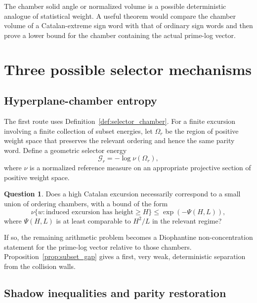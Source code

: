 \documentclass[11pt]{amsart}
\numberwithin{equation}{section}
\theoremstyle{plain}
\theoremstyle{definition}
\newtheorem{question}[theorem]{Question}
\theoremstyle{remark}
\begin{document}
The chamber solid angle or normalized volume is a possible deterministic analogue of statistical weight.  A useful theorem would compare the chamber volume of a Catalan-extreme sign word with that of ordinary sign words and then prove a lower bound for the chamber containing the actual prime-log vector.

\section{Three possible selector mechanisms}
\label{sec:selector_mechanisms}

\subsection{Hyperplane-chamber entropy}
\label{subsec:chamber_entropy}

The first route uses Definition~\ref{def:selector_chamber}.  For a finite excursion involving a finite collection of subset energies, let $\Omega_r$ be the region of positive weight space that preserves the relevant ordering and hence the same parity word.  Define a geometric selector energy
\begin{equation}
\mathcal{G}_r
=
-\log \nu(\Omega_r),
\label{eq:geometric_selector_energy}
\end{equation}
where $\nu$ is a normalized reference measure on an appropriate projective section of positive weight space.

\begin{question}
\label{question:chamber_vs_catalan_height}
Does a high Catalan excursion necessarily correspond to a small union of ordering chambers, with a bound of the form
\begin{equation}
\nu\{w:\text{induced excursion has height}\ge H\}
\le
\exp\!\left(-\Psi(H,L)\right),
\label{eq:chamber_height_rate}
\end{equation}
where $\Psi(H,L)$ is at least comparable to $H^2/L$ in the relevant regime?
\end{question}

If so, the remaining arithmetic problem becomes a Diophantine non-concentration statement for the prime-log vector relative to those chambers.  Proposition~\ref{prop:subset_gap} gives a first, very weak, deterministic separation from the collision walls.

\subsection{Shadow inequalities and parity restoration}
\label{subsec:shadow_restoration}
\end{document}
